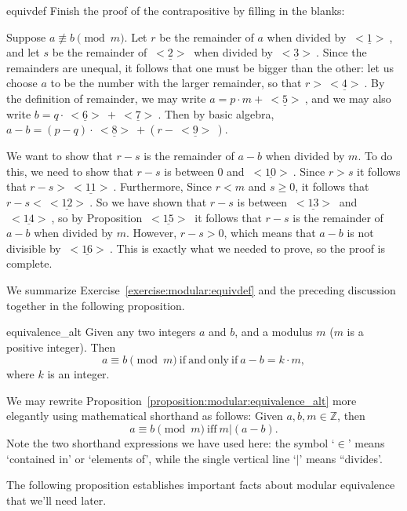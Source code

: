 \begin{exercise}{equivdef}
Finish the proof of the contrapositive by filling in the blanks:

\noindent
Suppose $a \not\equiv b \pmod{m}$. Let $r$ be the remainder of $a$ when divided by $\underline{~<1>~}$, and let $s$ be  the remainder of $\underline{~<2>~}$ when divided by $\underline{~<3>~}$. Since the remainders are unequal, it follows that one must be bigger than the other: let us choose $a$ to be the number with the larger remainder, so that $r > \underline{~<4>~}$. By the definition of remainder, we may write $a = p\cdot m + \underline{~<5>~}$, and we may also write $b = q\cdot \underline{~<6>~} + \underline{~<7>~}$. Then by basic algebra, $a - b = (p-q)\cdot \underline{~<8>~} + (r - \underline{~<9>~})$. 

We want to show that $r-s$ is the remainder of $a-b$ when divided by $m$. To do this, we need to show that $r-s$ is between 0 and $\underline{~<10>~}$. Since $r>s$ it follows that $r-s > \underline{~<11>~}$. Furthermore,
Since $r < m$ and $s \ge 0$, it follows that $r - s < \underline{~<12>~}$.  So we have shown that $r-s$ is between $\underline{~<13>~}$ and $\underline{~<14>~}$, so by Proposition   $\underline{~<15>~}$ it follows that
$r-s$ is the remainder of $a-b$ when divided by $m$. However, $r-s > 0$, which means that $a-b$ is not divisible by $\underline{~<16>~}$. This is exactly what we needed to prove, so the proof is complete. 
\end{exercise}

We summarize Exercise~\ref{exercise:modular:equivdef} and the preceding discussion together in the following proposition.

\begin{prop}{equivalence_alt}
Given any two integers $a$ and $b$, and a modulus $m$ ($m$ is a positive integer). Then 
\[
a \equiv b \pmod{m} \mathrm{~if~and~only~if~} a - b = k \cdot m,
\]
where $k$ is an integer.
\end{prop}
\noindent
We may rewrite Proposition~\ref{proposition:modular:equivalence_alt} more elegantly using mathematical shorthand as follows: Given $a,b,m \in {\mathbb Z}$, then 
\[
a \equiv b \pmod{m} \mathrm{~iff~} m | (a - b).
\]
Note the two shorthand expressions we have used here:  the symbol  `$\in$'  means `contained in' or `elements of', while the single vertical line `$|$' means ``divides'.


The following proposition establishes important facts about modular equivalence that we'll need later.

